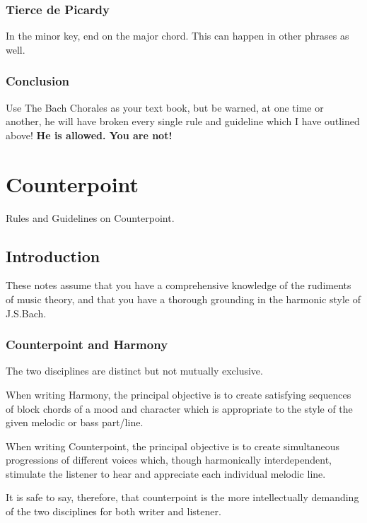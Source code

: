 \documentclass{article}
\begin{document}
\subsubsection{Tierce de Picardy}

In the minor key, end on the major chord.
This can happen in other phrases as well.

\subsubsection{Conclusion}

Use The Bach Chorales as your text book, but be warned, at one time or another, he will have broken every single rule and guideline which I have outlined above!
\textbf{He is allowed.
You are not!}

\newpage
\section{Counterpoint}

Rules and Guidelines on Counterpoint.

\subsection{Introduction}

These notes assume that you have a comprehensive knowledge of the rudiments of music theory, and that you have a thorough grounding in the harmonic style of J.S.Bach.

\subsubsection{Counterpoint and Harmony}

The two disciplines are distinct but not mutually exclusive.

When writing Harmony, the principal objective is to create satisfying sequences of block chords of a mood and character which is appropriate to the style of the given melodic or bass part/line.

When writing Counterpoint, the principal objective is to create simultaneous progressions of different voices which, though harmonically interdependent, stimulate the listener to hear and appreciate each individual melodic line.

It is safe to say, therefore, that counterpoint is the more intellectually demanding of the two disciplines for both writer and listener.
\end{document}
